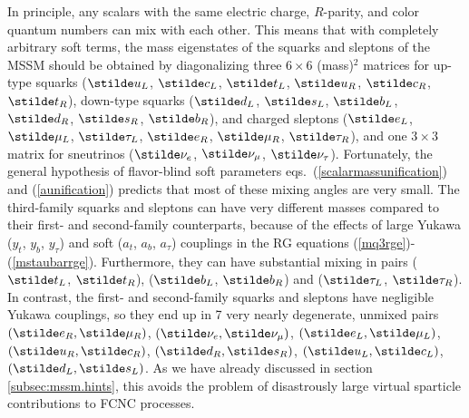 In principle, any scalars with the same
electric charge, $R$-parity, and color quantum numbers can mix with each
other.
This means that with completely arbitrary soft terms, the
mass eigenstates of the squarks and sleptons
of the MSSM should be obtained by diagonalizing three $6\times 6$
(mass)$^2$ matrices
for up-type squarks ($\stilde u_L$, $\stilde c_L$, $\stilde t_L$, $\stilde
u_R$, $\stilde c_R$, $\stilde t_R$),
down-type squarks ($\stilde d_L$, $\stilde
s_L$, $\stilde b_L$, $\stilde d_R$, $\stilde s_R$, $\stilde b_R$), and
charged
sleptons ($\stilde e_L$, $\stilde \mu_L$, $\stilde \tau_L$, $\stilde
e_R$, $\stilde \mu_R$, $\stilde \tau_R$),
and one $3\times 3$ matrix for sneutrinos ($\stilde \nu_e$, $\stilde
\nu_\mu$, $\stilde \nu_\tau$). Fortunately,
the general hypothesis of flavor-blind soft parameters
eqs.~(\ref{scalarmassunification}) and (\ref{aunification})
predicts that most of these mixing angles are very small.
The third-family squarks and sleptons can have very different masses
compared to their first- and second-family counterparts, because
of the effects of large Yukawa ($y_t$, $y_b$, $y_\tau$) and
soft ($a_t$, $a_b$, $a_\tau$) couplings in the RG
equations (\ref{mq3rge})-(\ref{mstaubarrge}). Furthermore, they
can have substantial mixing in pairs ($\stilde t_L$, $\stilde t_R$),
 ($\stilde b_L$, $\stilde b_R$) and ($\stilde \tau_L$, $\stilde \tau_R$).
In contrast, the first- and second-family squarks and sleptons have
negligible Yukawa couplings, so they end up in 7 very nearly
degenerate, unmixed pairs
$(\stilde e_R, \stilde \mu_R)$,
$(\stilde \nu_e, \stilde \nu_\mu)$,
$(\stilde e_L, \stilde \mu_L)$,
$(\stilde u_R, \stilde c_R)$,
$(\stilde d_R, \stilde s_R)$,
$(\stilde u_L, \stilde c_L)$,
$(\stilde d_L, \stilde s_L)$.
As we have
already discussed in section \ref{subsec:mssm.hints}, this avoids the
problem of
disastrously large virtual sparticle contributions to FCNC processes.

